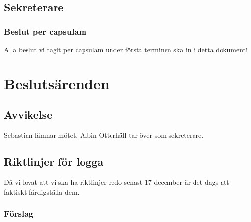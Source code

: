 \documentclass[protokoll]{dvd}
\begin{document}
    \subsection{Sekreterare}

        \subsubsection*{Beslut per capsulam}
            Alla beslut vi tagit per capsulam under första terminen ska in i detta dokument!

\newpage

\section{Beslutsärenden}

    \subsection{Avvikelse}
    Sebastian lämnar mötet. Albin Otterhäll tar över som sekreterare.

    \subsection{Riktlinjer för logga}
        Då vi lovat att vi ska ha riktlinjer redo senast 17 december är det dags att faktiskt färdigställa dem.

           \subsubsection*{Förslag} 
\end{document}

